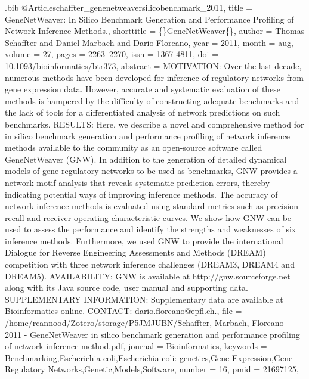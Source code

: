 \documentclass[
  table,
  10pt,
  a4paper]{article}
\begin{document}
\begin{filecontents}{\jobname.bib}
@Article{schaffter_genenetweaversilicobenchmark_2011,
	title = {{{GeneNetWeaver}}: In Silico Benchmark Generation and Performance Profiling of Network Inference Methods.},
	shorttitle = {\{\vphantom\}{{GeneNetWeaver}}\vphantom\{\}},
	author = {Thomas Schaffter and Daniel Marbach and Dario Floreano},
	year = {2011},
	month = {aug},
	volume = {27},
	pages = {2263--2270},
	issn = {1367-4811},
	doi = {10.1093/bioinformatics/btr373},
	abstract = {MOTIVATION: Over the last decade, numerous methods have been developed for inference of regulatory networks from gene expression data. However, accurate and systematic evaluation of these methods is hampered by the difficulty of constructing adequate benchmarks and the lack of tools for a differentiated analysis of network predictions on such benchmarks. RESULTS: Here, we describe a novel and comprehensive method for in silico benchmark generation and performance profiling of network inference methods available to the community as an open-source software called GeneNetWeaver (GNW). In addition to the generation of detailed dynamical models of gene regulatory networks to be used as benchmarks, GNW provides a network motif analysis that reveals systematic prediction errors, thereby indicating potential ways of improving inference methods. The accuracy of network inference methods is evaluated using standard metrics such as precision-recall and receiver operating characteristic curves. We show how GNW can be used to assess the performance and identify the strengths and weaknesses of six inference methods. Furthermore, we used GNW to provide the international Dialogue for Reverse Engineering Assessments and Methods (DREAM) competition with three network inference challenges (DREAM3, DREAM4 and DREAM5). AVAILABILITY: GNW is available at http://gnw.sourceforge.net along with its Java source code, user manual and supporting data. SUPPLEMENTARY INFORMATION: Supplementary data are available at Bioinformatics online. CONTACT: dario.floreano@epfl.ch.},
	file = {/home/rcannood/Zotero/storage/P5JMJUBN/Schaffter, Marbach, Floreano - 2011 - GeneNetWeaver in silico benchmark generation and performance profiling of network inference method.pdf},
	journal = {Bioinformatics},
	keywords = {Benchmarking,Escherichia coli,Escherichia coli: genetics,Gene Expression,Gene Regulatory Networks,Genetic,Models,Software},
	number = {16},
	pmid = {21697125},
}


\end{filecontents}
\end{document}

